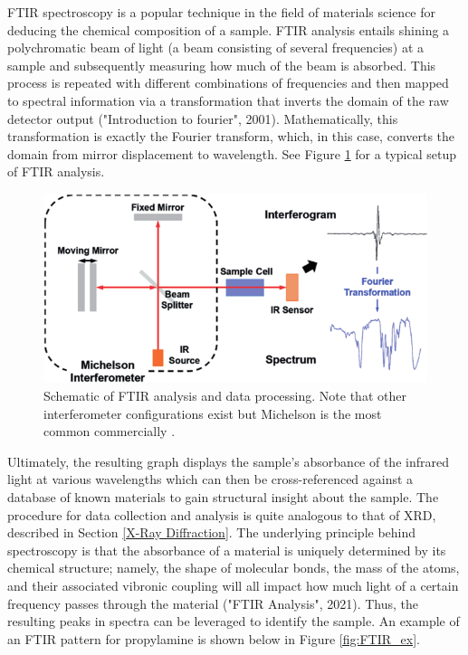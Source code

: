 \documentclass{dhbenelux}
\begin{document}
FTIR spectroscopy is a popular technique in the field of materials science for deducing the chemical composition of a sample. FTIR analysis entails shining a polychromatic beam of light (a beam consisting of several frequencies) at a sample and subsequently measuring how much of the beam is absorbed. This process is repeated with different combinations of frequencies and then mapped to spectral information via a transformation that inverts the domain of the raw detector output ("Introduction to fourier", 2001). Mathematically, this transformation is exactly the Fourier transform, which, in this case, converts the domain from mirror displacement to wavelength. See Figure \ref{fig:FTIR_setup} for a typical setup of FTIR analysis. 

\begin{figure}[!h]
    \centering
    \includegraphics[scale=0.5]{FTIR.png}
    \caption{Schematic of FTIR analysis and data processing. Note that other interferometer configurations exist but Michelson is the most common commercially \cite{FTIR_setup}.}
    \label{fig:FTIR_setup}
    
\end{figure}

Ultimately, the resulting graph displays the sample’s absorbance of the infrared light at various wavelengths which can then be cross-referenced against a database of known materials to gain structural insight about the sample. The procedure for data collection and analysis is quite analogous to that of XRD, described in Section \ref{X-Ray Diffraction}. The underlying principle behind spectroscopy is that the absorbance of a material is uniquely determined by its chemical structure; namely, the shape of molecular bonds, the mass of the atoms, and their associated vibronic coupling will all impact how much light of a certain frequency passes through the material ("FTIR Analysis", 2021). Thus, the resulting peaks in spectra can be leveraged to identify the sample. An example of an FTIR pattern for propylamine is shown below in Figure \ref{fig:FTIR_ex}.
\end{document}
